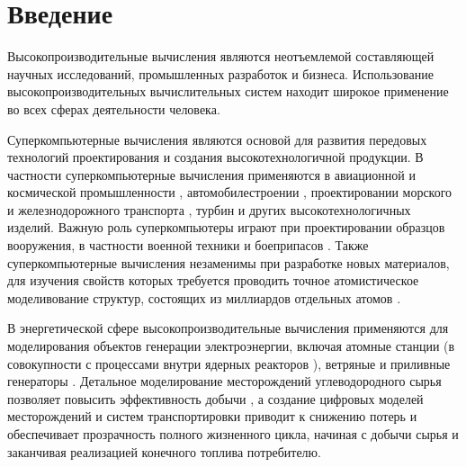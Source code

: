 \newpage
\section*{Введение}                      %

Высокопроизводительные вычисления являются неотъемлемой составляющей научных исследований, промышленных разработок и бизнеса.
Использование высокопроизводительных вычислительных систем \cite{GOST57700HPC} находит широкое применение во всех сферах деятельности человека.

Суперкомпьютерные вычисления являются основой для развития передовых технологий проектирования и создания высокотехнологичной продукции.
В частности суперкомпьютерные вычисления применяются в авиационной и космической промышленности \cite{Kornev2021SuperAvio}, автомобилестроении \cite{Wang2020SuperAuto}, проектировании морского и железнодорожного транспорта \cite{Nikitin2018SuperShip,Solovyev2013SuperTrains}, турбин \cite{Duben2022SuperTurbine} и других высокотехнологичных изделий.
Важную роль суперкомпьютеры играют при проектировании образцов вооружения, в частности военной техники и боеприпасов \cite{Ageeva2023SuperMilitary}.
Также суперкомпьютерные вычисления незаменимы при разработке новых материалов, для изучения свойств которых требуется проводить точное атомистическое моделивование структур, состоящих из миллиардов отдельных атомов \cite{Wang2025SuperMolDyn}.

В энергетической сфере высокопроизводительные вычисления применяются для моделирования объектов генерации электроэнергии, включая атомные станции \cite{Cancemi2025SuperNuc} (в совокупности с процессами внутри ядерных реакторов \cite{Zhang2025SuperNuclear}), ветряные и приливные генераторы \cite{Quint2025SuperWind,Parrado2024SuperTidal}.
Детальное моделирование месторождений углеводородного сырья позволяет повысить эффективность добычи \cite{Usmanov2024SuperPlast}, а создание цифровых моделей месторождений и систем транспортировки \cite{Didenko2023SuperOil} приводит к снижению потерь и обеспечивает прозрачность полного жизненного цикла, начиная с добычи сырья и заканчивая реализацией конечного топлива потребителю.

